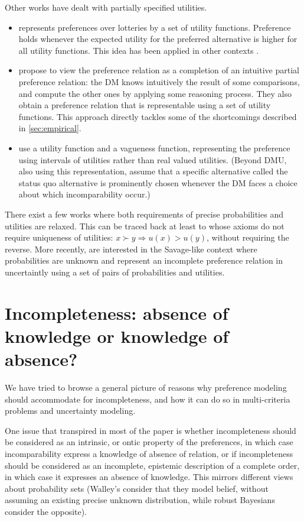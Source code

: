 \documentclass[version=last, pagesize, twocolumn, twoside=off, bibliography=totoc, 12pt, a4paper, english]{scrartcl}
\begin{document}
	Other works have dealt with partially specified utilities.
	\begin{itemize}
		\item \citet{dubra_expected_2004} represents preferences over lotteries by a set of utility functions. Preference holds whenever the expected utility for the preferred alternative is higher for all utility functions. This idea has been applied in other contexts \citep{ok_utility_2002}.
		\item \citet{dubra_model_2002} propose to view the preference relation as a completion of an intuitive partial preference relation: the \ac{DM} knows intuitively the result of some comparisons, and compute the other ones by applying some reasoning process. They also obtain a preference relation that is representable using a set of utility functions. This approach directly tackles some of the shortcomings described in \cref{sec:empirical}.
		\item \citet{manzini_representation_2008} use a utility function and a vagueness function, representing the preference using intervals of utilities rather than real valued utilities. (Beyond DMU, also using this representation, \citet{masatlioglu_rational_2005} assume that a specific alternative called the status quo alternative is prominently chosen whenever the \ac{DM} faces a choice about which incomparability occur.)
	\end{itemize}

	There exist a few works where both requirements of precise probabilities and utilities are relaxed. This can be traced back at least to \citet{aumann_utility_1962} whose axioms do not require uniqueness of utilities: $x \succ y ⇒ u(x) > u(y)$, without requiring the reverse. More recently, \citet{galaabaatar_subjective_2013} are interested in the Savage-like context where probabilities are unknown and represent an incomplete preference relation in uncertaintly using a set of pairs of probabilities and utilities.


	\section{Incompleteness: absence of knowledge or knowledge of absence?}
	
	We have tried to browse a general picture of reasons why preference modeling should accommodate for incompleteness, and how it can do so in multi-criteria problems and uncertainty modeling. 
	
	One issue that transpired in most of the paper is whether incompleteness should be considered as an intrinsic, or ontic property of the preferences, in which case incomparability express a knowledge of absence of relation, or if incompleteness should be considered as an incomplete, epistemic description of a complete order, in which case it expresses an absence of knowledge. This mirrors different views about probability sets (Walley's consider that they model belief, without assuming an existing precise unknown distribution, while robust Bayesians consider the opposite). 
	
\end{document}
